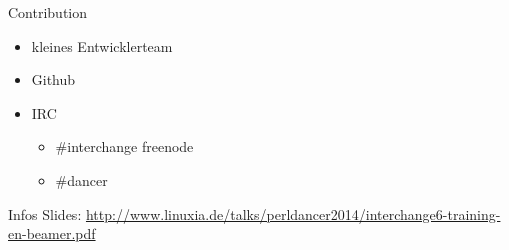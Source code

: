 \begin{frame}{Contribution}
\begin{itemize}
\item kleines Entwicklerteam
\item Github
\item IRC 
\begin{itemize}
\item \#interchange freenode
\item \#dancer
\end{itemize}
\end{itemize}
\end{frame}

\begin{frame}{Infos}
Slides:
\url{http://www.linuxia.de/talks/perldancer2014/interchange6-training-en-beamer.pdf}
\end{frame}



